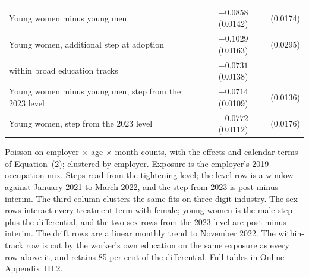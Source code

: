 \begin{table}[ht!]
\begin{tabular}{lcc}
Young women minus young men & $-0.0858$ (0.0142) & (0.0174) \\
Young women, additional step at adoption & $-0.1029$ (0.0163) & (0.0295) \\
\quad within broad education tracks & $-0.0731$ (0.0138) & \\
Young women minus young men, step from the 2023 level & $-0.0714$ (0.0109) & (0.0136) \\
Young women, step from the 2023 level & $-0.0772$ (0.0112) & (0.0176) \\
\bottomrule
\end{tabular}
\begin{minipage}{0.92\textwidth}\footnotesize\vspace{4pt}
Poisson on employer $\times$ age $\times$ month counts, with the effects and calendar terms of Equation~(2); clustered by employer. Exposure is the employer's 2019 occupation mix. Steps read from the tightening level; the level row is a window against January 2021 to March 2022, and the step from 2023 is post minus interim. The third column clusters the same fits on three-digit industry. The sex rows interact every treatment term with female; young women is the male step plus the differential, and the two sex rows from the 2023 level are post minus interim. The drift rows are a linear monthly trend to November 2022. The within-track row is cut by the worker's own education on the same exposure as every row above it, and retains 85 per cent of the differential. Full tables in Online Appendix~III.2.
\end{minipage}
\end{table}

